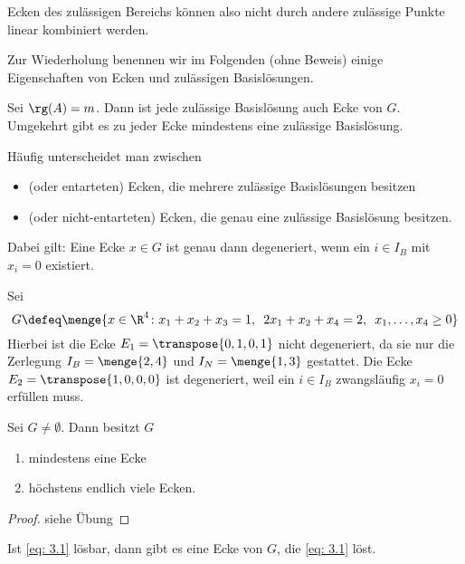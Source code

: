 Ecken des zulässigen Bereichs können also nicht durch andere zulässige Punkte linear kombiniert werden.

Zur Wiederholung benennen wir im Folgenden (ohne Beweis) einige Eigenschaften von Ecken und zulässigen Basislösungen.

\begin{satz} %
	Sei $\rg(A) = m$. Dann ist jede zulässige Basislösung auch Ecke von $G$. Umgekehrt gibt es zu jeder Ecke mindestens eine zulässige Basislösung.
\end{satz}

Häufig unterscheidet man zwischen 
\begin{itemize}[nolistsep, topsep=-\parskip]
	\item {} (oder entarteten) Ecken, die mehrere zulässige Basislösungen besitzen
	\item {} (oder nicht-entarteten) Ecken, die genau eine zulässige Basislösung besitzen.
\end{itemize}
Dabei gilt: Eine Ecke $x \in G$ ist genau dann degeneriert, wenn ein $i \in I_B$ mit $x_i=0$ existiert.

\begin{beispiel} %
	Sei
	\begin{equation*}
		G \defeq \menge{x \in \R^4 \colon x_1+x_2+x_3=1, \enskip 2x_1+x_2+x_4=2, \enskip x_1,\dots , x_4 \ge 0}
	\end{equation*}
	Hierbei ist die Ecke $E_1 = \transpose{0,1,0,1}$ nicht degeneriert, da sie nur die Zerlegung $I_B = \menge{2,4}$ und $I_N = \menge{1,3}$ gestattet.
	Die Ecke $E_2 = \transpose{1,0,0,0}$ ist degeneriert, weil ein $i \in I_B$ zwangsläufig $x_i = 0$ erfüllen muss.
\end{beispiel}

\begin{satz} %
	Sei $G \neq \emptyset$. Dann besitzt $G$
	\begin{enumerate}[nolistsep, topsep=-\parskip]
		\item mindestens eine Ecke
		\item höchstens endlich viele Ecken.
	\end{enumerate}
\end{satz}
\begin{proof}
	siehe Übung
\end{proof}

\begin{satz} %
	Ist \eqref{eq: 3.1} lösbar, dann gibt es eine Ecke von $G$, die \eqref{eq: 3.1} löst.
\end{satz}

